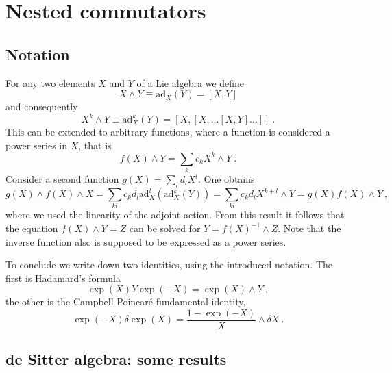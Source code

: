 \documentclass[11pt]{article}
\begin{document}
\newpage
\appendix
\section{Nested commutators}

\subsection{Notation}

\label{app:nested_comm.not}

For any two elements $X$ and $Y$ of a Lie algebra we define
%
\begin{displaymath}
	X \wedge Y \equiv \mathrm{ad}_X (Y) = [X,Y]
\end{displaymath}
and consequently
\begin{displaymath}
	X^k \wedge Y \equiv \mathrm{ad}_X^k (Y) = 
	[X,[X,\ldots[X,Y]\ldots]]~.
\end{displaymath}
This can be extended to arbitrary functions, where a function is 
considered a power series in $X$, that is
%
\begin{displaymath}
	f(X) \wedge Y = \sum_k c_k X^k \wedge Y~.
\end{displaymath}
Consider a second function $g(X) = \sum_l d_l X^l$. One obtains
%
\begin{displaymath}
	g(X)\wedge f(X)\wedge X = \sum_{kl} c_k d_l 
	\mathrm{ad}_X^l(\mathrm{ad}_X^k(Y)) = \sum_{kl} c_k d_l 
	X^{k+l} \wedge Y = g(X)f(X) \wedge Y~,
\end{displaymath}
where we used the linearity of the adjoint action.
From this result it follows that the equation $f(X) \wedge Y = Z$ 
can be solved for $Y = f(X)^{-1} \wedge Z$. Note that the inverse 
function also is supposed to be expressed as a power series.

To conclude we write down two identities, using the introduced 
notation.  The first is Hadamard's formula
%
\begin{equation}\label{eq:Had}
	\exp(X) Y \exp(-X) = \exp(X) \wedge Y~,
\end{equation}
the other is the Campbell-Poincar\'e fundamental identity,
\begin{equation}\label{eq:CP}
	\exp(-X) \delta\exp(X) = \frac{1-\exp(-X)}{X}\wedge \delta X~.
\end{equation}

\subsection{de Sitter algebra: some results}
\end{document}
